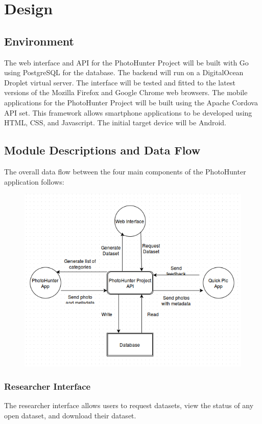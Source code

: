 \documentclass{article}
\begin{document}
\section{Design}
\subsection{Environment}
The web interface and API for the PhotoHunter Project will be built with Go
using PostgreSQL for the database. The backend will run on a DigitalOcean
Droplet virtual server. The interface will be tested and fitted to the latest
versions of the Mozilla Firefox and Google Chrome web browsers. The mobile
applications for the PhotoHunter Project will be built using the Apache Cordova
API set. This framework allows smartphone applications to be developed using
HTML, CSS, and Javascript. The initial target device will be Android.

\subsection{Module Descriptions and Data Flow}
The overall data flow between the four main components of the PhotoHunter
application follows:
\begin{figure}
  \centering
  \includegraphics[scale = 0.5]{ss_flowchart}
\end{figure}

\subsubsection{Researcher Interface}
The researcher interface allows users to request datasets, view the status of
any open dataset, and download their dataset.
\end{document}
